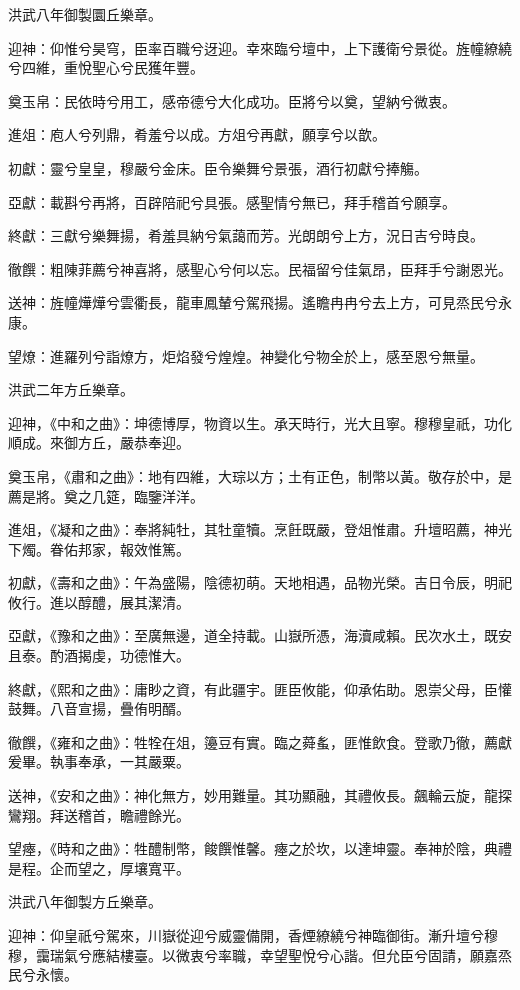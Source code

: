 洪武八年御製圜丘樂章。

迎神：仰惟兮昊穹，臣率百職兮迓迎。幸來臨兮壇中，上下護衛兮景從。旌幢繚繞兮四維，重悅聖心兮民獲年豐。

奠玉帛：民依時兮用工，感帝德兮大化成功。臣將兮以奠，望納兮微衷。

進俎：庖人兮列鼎，肴羞兮以成。方俎兮再獻，願享兮以歆。

初獻：靈兮皇皇，穆嚴兮金床。臣令樂舞兮景張，酒行初獻兮捧觴。

亞獻：載斟兮再將，百辟陪祀兮具張。感聖情兮無已，拜手稽首兮願享。

終獻：三獻兮樂舞揚，肴羞具納兮氣藹而芳。光朗朗兮上方，況日吉兮時良。

徹饌：粗陳菲薦兮神喜將，感聖心兮何以忘。民福留兮佳氣昂，臣拜手兮謝恩光。

送神：旌幢燁燁兮雲衢長，龍車鳳輦兮駕飛揚。遙瞻冉冉兮去上方，可見烝民兮永康。

望燎：進羅列兮詣燎方，炬焰發兮煌煌。神變化兮物全於上，感至恩兮無量。

洪武二年方丘樂章。

迎神，《中和之曲》：坤德博厚，物資以生。承天時行，光大且寧。穆穆皇祇，功化順成。來御方丘，嚴恭奉迎。

奠玉帛，《肅和之曲》：地有四維，大琮以方；土有正色，制幣以黃。敬存於中，是薦是將。奠之几筵，臨鑒洋洋。

進俎，《凝和之曲》：奉將純牡，其牡童犢。烹飪既嚴，登俎惟肅。升壇昭薦，神光下燭。眷佑邦家，報效惟篤。

初獻，《壽和之曲》：午為盛陽，陰德初萌。天地相遇，品物光榮。吉日令辰，明祀攸行。進以醇醴，展其潔清。

亞獻，《豫和之曲》：至廣無邊，道全持載。山嶽所憑，海瀆咸賴。民次水土，既安且泰。酌酒揭虔，功德惟大。

終獻，《熙和之曲》：庸眇之資，有此疆宇。匪臣攸能，仰承佑助。恩崇父母，臣懽鼓舞。八音宣揚，疊侑明醑。

徹饌，《雍和之曲》：牲牷在俎，籩豆有實。臨之蕣蚃，匪惟飲食。登歌乃徹，薦獻爰畢。執事奉承，一其嚴粟。

送神，《安和之曲》：神化無方，妙用難量。其功顯融，其禮攸長。飆輪云旋，龍探鸞翔。拜送稽首，瞻禮餘光。

望瘞，《時和之曲》：牲醴制幣，餕饌惟馨。瘞之於坎，以達坤靈。奉神於陰，典禮是程。企而望之，厚壤寬平。

洪武八年御製方丘樂章。

迎神：仰皇祇兮駕來，川嶽從迎兮威靈備開，香煙繚繞兮神臨御街。漸升壇兮穆穆，靄瑞氣兮應結樓臺。以微衷兮率職，幸望聖悅兮心諧。但允臣兮固請，願嘉烝民兮永懷。

